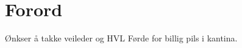 \chapter*{Forord}
\thispagestyle{fancy}
Ønkser å takke veileder og HVL Førde for billig pils i kantina.


\thispagestyle{empty}